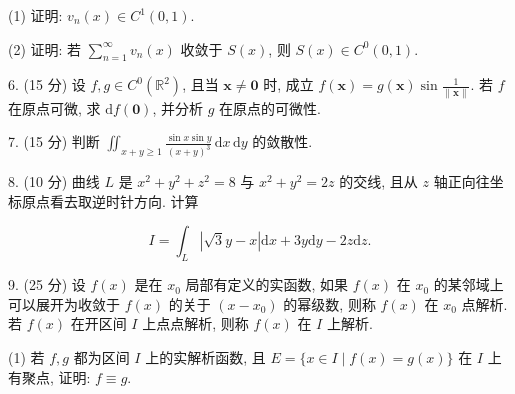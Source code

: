 \documentclass{examcollection}
\renewcommand{\displayformula}[1]{\[#1\]}
\begin{document}
{\begin{minipage}{\textwidth}
(1) 证明: $v_{n}(x) \in C^{1}(0,1)$.\par
(2) 证明: 若 $\sum_{n=1}^{\infty} v_n(x)$ 收敛于 $S(x)$, 则 $S(x) \in C^0(0,1)$.\par
6. (15 分) 设 $f, g \in C^0(\mathbb{R}^2)$, 且当 $\pmb{x} \neq \pmb{0}$ 时, 成立 $f(\pmb{x}) = g(\pmb{x}) \sin \frac{1}{\|\pmb{x}\|}$. 若 $f$ 在原点可微, 求 $\mathrm{d}f(\mathbf{0})$, 并分析 $g$ 在原点的可微性.\par
7. (15 分) 判断 $\iint_{x + y \geq 1} \frac{\sin x \sin y}{(x + y)^3} \, \mathrm{d}x \, \mathrm{d}y$ 的敛散性.\par
8. (10 分) 曲线 $L$ 是 $x^{2} + y^{2} + z^{2} = 8$ 与 $x^{2} + y^{2} = 2z$ 的交线, 且从 $z$ 轴正向往坐标原点看去取逆时针方向. 计算\par
\displayformula{I = \int_ {L} | \sqrt {3} y - x | \mathrm{d} x + 3 y \mathrm{d} y - 2 z \mathrm{d} z.}\par
9. (25 分) 设 $f(x)$ 是在 $x_0$ 局部有定义的实函数, 如果 $f(x)$ 在 $x_0$ 的某邻域上可以展开为收敛于 $f(x)$ 的关于 $(x - x_0)$ 的幂级数, 则称 $f(x)$ 在 $x_0$ 点解析. 若 $f(x)$ 在开区间 $I$ 上点点解析, 则称 $f(x)$ 在 $I$ 上解析.\par
(1) 若 $f, g$ 都为区间 $I$ 上的实解析函数, 且 $E = \{x \in I \mid f(x) = g(x)\}$ 在 $I$ 上有聚点, 证明: $f \equiv g$.\par
\end{minipage}}
\ifdim\dimexpr\ht\proofbox+\dp\proofbox\relax>\textheight
\noindent\resizebox{!}{\textheight}{\usebox{\proofbox}}\else\noindent\usebox{\proofbox}\fi\clearpage
\end{document}
